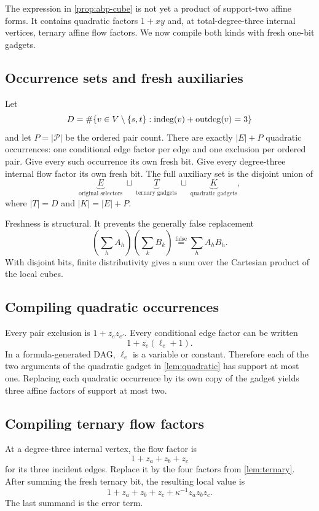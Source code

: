 The expression in \cref{prop:abp-cube} is not yet a product of support-two affine forms.
It contains quadratic factors \(1+xy\) and, at total-degree-three internal vertices,
ternary affine flow factors.  We now compile both kinds with fresh one-bit gadgets.

\subsection{Occurrence sets and fresh auxiliaries}

Let
\[
  D=\#\{v\in V\setminus\{s,t\}:\operatorname{indeg}(v)+\operatorname{outdeg}(v)=3\}
\]
and let \(P=|\mathcal P|\) be the ordered pair count.  There are exactly
\(|E|+P\) quadratic occurrences: one conditional edge factor per edge and one exclusion
per ordered pair.  Give every such occurrence its own fresh bit.  Give every degree-three
internal flow factor its own fresh bit.  The full auxiliary set is the disjoint union of
\[
  \underbrace{E}_{\text{original selectors}}
  \ \sqcup\ 
  \underbrace{T}_{\text{ternary gadgets}}
  \ \sqcup\ 
  \underbrace{K}_{\text{quadratic gadgets}},
\]
where \(|T|=D\) and \(|K|=|E|+P\).

Freshness is structural.  It prevents the generally false replacement
\[
  \left(\sum_h A_h\right)\left(\sum_k B_k\right)
  \stackrel{\text{false}}{=}
  \sum_h A_hB_h.
\]
With disjoint bits, finite distributivity gives a sum over the Cartesian product of the
local cubes.

\subsection{Compiling quadratic occurrences}

Every pair exclusion is \(1+z_ez_{e'}\).  Every conditional edge factor can be written
\[
  1+z_e(\ell_e+1).
\]
In a formula-generated DAG, \(\ell_e\) is a variable or constant.  Therefore each of the
two arguments of the quadratic gadget in \cref{lem:quadratic} has support at most one.
Replacing each quadratic occurrence by its own copy of the gadget yields three affine
factors of support at most two.

\subsection{Compiling ternary flow factors}

At a degree-three internal vertex, the flow factor is
\[
  1+z_a+z_b+z_c
\]
for its three incident edges.  Replace it by the four factors from
\cref{lem:ternary}.  After summing the fresh ternary bit, the resulting local value is
\[
  1+z_a+z_b+z_c+\kappa^{-1}z_az_bz_c.
\]
The last summand is the error term.

